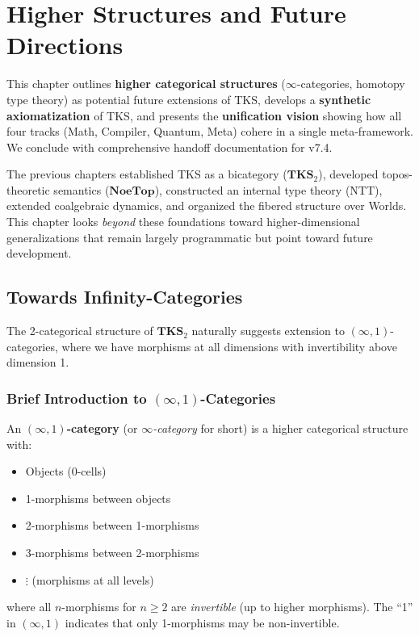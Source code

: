\chapter{Higher Structures and Future Directions}
\label{ch:higher-structures}

\begin{tcolorbox}[colback=blue!5!white,colframe=blue!75!black,title=\vnewthree]
This chapter outlines \textbf{higher categorical structures} ($\infty$-categories,
homotopy type theory) as potential future extensions of TKS, develops a
\textbf{synthetic axiomatization} of TKS, and presents the \textbf{unification vision}
showing how all four tracks (Math, Compiler, Quantum, Meta) cohere in a single
meta-framework. We conclude with comprehensive handoff documentation for v7.4.
\end{tcolorbox}

The previous chapters established TKS as a bicategory ($\mathbf{TKS}_2$), developed
topos-theoretic semantics ($\mathbf{NoeTop}$), constructed an internal type theory
(NTT), extended coalgebraic dynamics, and organized the fibered structure over Worlds.
This chapter looks \emph{beyond} these foundations toward higher-dimensional
generalizations that remain largely programmatic but point toward future development.

\section{Towards Infinity-Categories}
\label{sec:infinity-categories}

The 2-categorical structure of $\mathbf{TKS}_2$ naturally suggests extension to
$(\infty, 1)$-categories, where we have morphisms at all dimensions with
invertibility above dimension 1.

\subsection{Brief Introduction to $(\infty,1)$-Categories}
\label{subsec:infty-cat-intro}

\begin{definition}
\label{def:infty-1-cat-informal}
An \textbf{$(\infty,1)$-category} (or \emph{$\infty$-category} for short) is a
higher categorical structure with:
\begin{itemize}
  \item Objects (0-cells)
  \item 1-morphisms between objects
  \item 2-morphisms between 1-morphisms
  \item 3-morphisms between 2-morphisms
  \item $\vdots$ (morphisms at all levels)
\end{itemize}
where all $n$-morphisms for $n \geq 2$ are \emph{invertible} (up to higher
morphisms). The ``1'' in $(\infty, 1)$ indicates that only 1-morphisms may
be non-invertible.
\end{definition}

